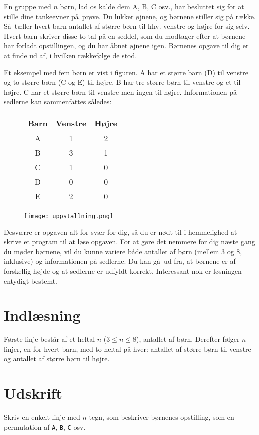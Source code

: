 En gruppe med $n$ børn, lad os kalde dem A, B, C osv., har besluttet sig for at stille dine tankeevner på prøve.
Du lukker øjnene, og børnene stiller sig på række.
Så tæller hvert barn antallet af større børn til hhv. venstre og højre for sig selv.
Hvert barn skriver disse to tal på en seddel, som du modtager efter at børnene har forladt opstillingen, og du har åbnet øjnene igen.
Børnenes opgave til dig er at finde ud af, i hvilken rækkefølge de stod.

Et eksempel med fem børn er vist i figuren.
A har et større barn (D) til venstre og to større børn (C og E) til højre.
B har tre større børn til venstre og et til højre.
C har et større børn til venstre men ingen til højre. 
Informationen på sedlerne kan sammenfattes således:

\begin{figure}[h!]
  \centering

\begin{minipage}{.5\textwidth}
    \begin{tabular}[b]{|c|c|c|}
    \hline
      Barn&Venstre&Højre\\\hline
      A&1&2\\
      B&3&1\\
      C&1&0\\
      D&0&0\\
      E&2&0\\\hline
    \end{tabular}
\end{minipage}%
\begin{minipage}{.5\textwidth}
    \texttt{[image: uppstallning.png]}
\end{minipage}

\end{figure}

Desværre er opgaven alt for svær for dig, så du er nødt til i hemmelighed at skrive et program til at løse opgaven.
For at gøre det nemmere for dig næste gang du møder børnene, vil du kunne variere både antallet af børn (mellem $3$ og $8$, inklusive) og informationen på sedlerne.
Du kan gå ud fra, at børnene er af forskellig højde og at sedlerne er udfyldt korrekt.
Interessant nok er løsningen entydigt bestemt.

\section*{Indlæsning}
Første linje består af et heltal $n$ ($3 \le n \le 8$), antallet af børn.
Derefter følger $n$ linjer, en for hvert barn,  med to heltal på hver: antallet af større børn til venstre og antallet af større børn til højre.

\section*{Udskrift}
Skriv en enkelt linje med $n$ tegn, som beskriver børnenes opstilling, som en permutation af \texttt{A}, \texttt{B}, \texttt{C} osv.
